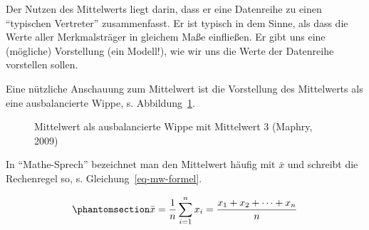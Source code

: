 \documentclass[
  letterpaper,
]{scrbook}
\theoremstyle{definition}
\theoremstyle{definition}
\theoremstyle{definition}
\theoremstyle{remark}
\begin{document}
\begin{tcolorbox}[enhanced jigsaw, left=2mm, toptitle=1mm, toprule=.15mm, rightrule=.15mm, leftrule=.75mm, breakable, colbacktitle=quarto-callout-important-color!10!white, colback=white, coltitle=black, bottomtitle=1mm, opacityback=0, title=\textcolor{quarto-callout-important-color}{\faExclamation}\hspace{0.5em}{Wichtig}, colframe=quarto-callout-important-color-frame, arc=.35mm, opacitybacktitle=0.6, bottomrule=.15mm, titlerule=0mm]

Der Nutzen des Mittelwerts liegt darin, dass er eine Datenreihe zu einen
``typischen Vertreter'' zusammenfasst. Er ist typisch in dem Sinne, als
dass die Werte aller Merkmalsträger in gleichem Maße einfließen. Er gibt
uns eine (mögliche) Vorstellung (ein Modell!), wie wir uns die Werte der
Datenreihe vorstellen sollen.

\end{tcolorbox}

Eine nützliche Anschauung zum Mittelwert ist die Vorstellung des
Mittelwerts als eine ausbalancierte Wippe, s. Abbildung~\ref{fig-wippe}.

\begin{figure}


\caption{\label{fig-wippe}Mittelwert als ausbalancierte Wippe mit
Mittelwert 3 (Maphry, 2009)}

\end{figure}%

In ``Mathe-Sprech'' bezeichnet man den Mittelwert häufig mit \(\bar{x}\)
und schreibt die Rechenregel so, s. Gleichung~\ref{eq-mw-formel}.

\begin{equation}\phantomsection\label{eq-mw-formel}{\bar {x} =\frac{1}{n} \sum_{i=1}^{n}{x_{i}}=\frac {x_{1}+x_{2}+\dotsb +x_{n}} {n}}\end{equation}
\end{document}
